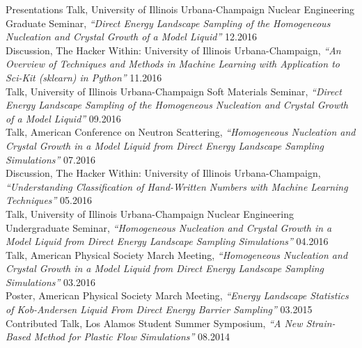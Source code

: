 \documentclass[9pt]{resume} %
\begin{document}
\begin{rSection}{Presentations}
	Talk, University of Illinois Urbana-Champaign Nuclear Engineering Graduate Seminar, {\it{``Direct Energy Landscape Sampling of the Homogeneous Nucleation and Crystal Growth of a Model Liquid''}} \hfill {12.2016}
	\\[5pt]
	Discussion, The Hacker Within: University of Illinois Urbana-Champaign, {\it{``An Overview of Techniques and Methods in Machine Learning with Application to Sci-Kit (sklearn) in Python''}} \hfill {11.2016}
	\\[5pt]
	Talk, University of Illinois Urbana-Champaign Soft Materials Seminar, {\it{``Direct Energy Landscape Sampling of the Homogeneous Nucleation and Crystal Growth of a Model Liquid''}} \hfill {09.2016}
	\\[5pt]
	Talk, American Conference on Neutron Scattering, {\it{``Homogeneous Nucleation and Crystal Growth in a Model Liquid from Direct Energy Landscape Sampling Simulations''}} \hfill {07.2016}
	\\[5pt]
	Discussion, The Hacker Within: University of Illinois Urbana-Champaign, {\it{``Understanding Classification of Hand-Written Numbers with Machine Learning Techniques''}} \hfill {05.2016}
	\\[5pt]
	Talk, University of Illinois Urbana-Champaign Nuclear Engineering Undergraduate Seminar, {\it{``Homogeneous Nucleation and Crystal Growth in a Model Liquid from Direct Energy Landscape Sampling Simulations''}} \hfill {04.2016} 
	\\[5pt]
	Talk, American Physical Society March Meeting, {\it{``Homogeneous Nucleation and Crystal Growth in a Model Liquid from Direct Energy Landscape Sampling Simulations''}} \hfill {03.2016}
	\\[5pt]
	Poster, American Physical Society March Meeting, {\it{``Energy Landscape Statistics of Kob-Andersen Liquid From Direct Energy Barrier Sampling''}} \hfill {03.2015}
	\\[5pt]
	Contributed Talk, Los Alamos Student Summer Symposium, {\it{``A New Strain-Based Method for Plastic Flow Simulations''}} \hfill {08.2014} \\
\end{rSection}
\end{document}
